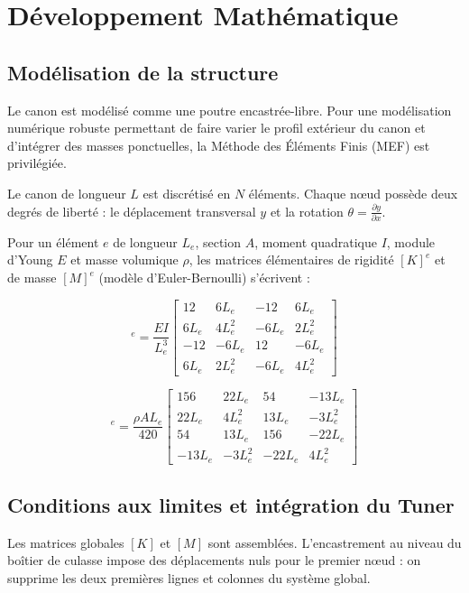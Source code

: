 \documentclass[12pt,a4paper]{article}
\begin{document}
	\section{Développement Mathématique}
	
	\subsection{Modélisation de la structure}
	Le canon est modélisé comme une poutre encastrée-libre. Pour une modélisation numérique robuste permettant de faire varier le profil extérieur du canon et d'intégrer des masses ponctuelles, la Méthode des Éléments Finis (MEF) est privilégiée. 
	
	Le canon de longueur $L$ est discrétisé en $N$ éléments. Chaque nœud possède deux degrés de liberté : le déplacement transversal $y$ et la rotation $\theta = \frac{\partial y}{\partial x}$.
	
	Pour un élément $e$ de longueur $L_e$, section $A$, moment quadratique $I$, module d'Young $E$ et masse volumique $\rho$, les matrices élémentaires de rigidité $[K]^e$ et de masse $[M]^e$ (modèle d'Euler-Bernoulli) s'écrivent :
	
	\begin{equation}
		[K]^e = \frac{EI}{L_e^3} 
		\begin{bmatrix} 
			12 & 6L_e & -12 & 6L_e \\ 
			6L_e & 4L_e^2 & -6L_e & 2L_e^2 \\ 
			-12 & -6L_e & 12 & -6L_e \\ 
			6L_e & 2L_e^2 & -6L_e & 4L_e^2 
		\end{bmatrix}
	\end{equation}
	
	\begin{equation}
		[M]^e = \frac{\rho A L_e}{420} 
		\begin{bmatrix} 
			156 & 22L_e & 54 & -13L_e \\ 
			22L_e & 4L_e^2 & 13L_e & -3L_e^2 \\ 
			54 & 13L_e & 156 & -22L_e \\ 
			-13L_e & -3L_e^2 & -22L_e & 4L_e^2 
		\end{bmatrix}
	\end{equation}
	
	\subsection{Conditions aux limites et intégration du Tuner}
	Les matrices globales $[K]$ et $[M]$ sont assemblées. L'encastrement au niveau du boîtier de culasse impose des déplacements nuls pour le premier nœud : on supprime les deux premières lignes et colonnes du système global.
	
\end{document}
